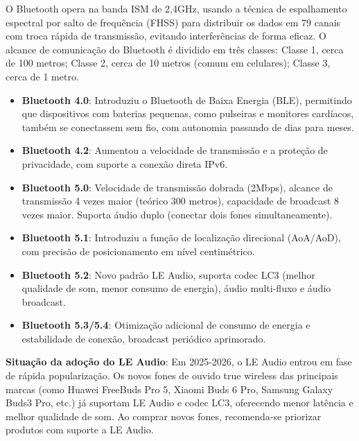 
O Bluetooth opera na banda ISM de 2,4GHz, usando a técnica de espalhamento espectral por salto de frequência (FHSS) para distribuir os dados em 79 canais com troca rápida de transmissão, evitando interferências de forma eficaz. O alcance de comunicação do Bluetooth é dividido em três classes: Classe 1, cerca de 100 metros; Classe 2, cerca de 10 metros (comum em celulares); Classe 3, cerca de 1 metro.


\begin{itemize}
  \item \textbf{Bluetooth 4.0}: Introduziu o Bluetooth de Baixa Energia (BLE), permitindo que dispositivos com baterias pequenas, como pulseiras e monitores cardíacos, também se conectassem sem fio, com autonomia passando de dias para meses.
  \item \textbf{Bluetooth 4.2}: Aumentou a velocidade de transmissão e a proteção de privacidade, com suporte a conexão direta IPv6.
  \item \textbf{Bluetooth 5.0}: Velocidade de transmissão dobrada (2Mbps), alcance de transmissão 4 vezes maior (teórico 300 metros), capacidade de broadcast 8 vezes maior. Suporta áudio duplo (conectar dois fones simultaneamente).
  \item \textbf{Bluetooth 5.1}: Introduziu a função de localização direcional (AoA/AoD), com precisão de posicionamento em nível centimétrico.
  \item \textbf{Bluetooth 5.2}: Novo padrão LE Audio, suporta codec LC3 (melhor qualidade de som, menor consumo de energia), áudio multi-fluxo e áudio broadcast.
  \item \textbf{Bluetooth 5.3/5.4}: Otimização adicional de consumo de energia e estabilidade de conexão, broadcast periódico aprimorado.
\end{itemize}

\textbf{Situação da adoção do LE Audio}: Em 2025-2026, o LE Audio entrou em fase de rápida popularização. Os novos fones de ouvido true wireless das principais marcas (como Huawei FreeBuds Pro 5, Xiaomi Buds 6 Pro, Samsung Galaxy Buds3 Pro, etc.) já suportam LE Audio e codec LC3, oferecendo menor latência e melhor qualidade de som. Ao comprar novos fones, recomenda-se priorizar produtos com suporte a LE Audio.


